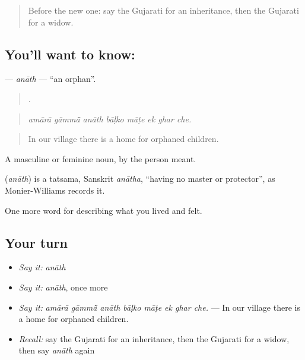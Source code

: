 \label{lesson:GU-C500-anath}



\begin{quote}
Before the new one: say the Gujarati for an inheritance, then the Gujarati for a widow.
\end{quote}

\subsection*{You'll want to know: }
\textbf{} — \emph{anāth} — \textquotedblleft{}an orphan\textquotedblright{}.

\begin{quote}
       .
\end{quote}

\begin{quote}
\emph{amārā gāmmā̃ anāth bāḷko māṭe ek ghar che.}
\end{quote}

\begin{quote}
In our village there is a home for orphaned children.
\end{quote}

A masculine or feminine noun, by the person meant.

\begin{cousinweb}
\textbf{} (\emph{anāth}) is a tatsama, Sanskrit \emph{anātha}, \textquotedblleft{}having no master or protector\textquotedblright{}, as Monier-Williams records it.
\end{cousinweb}

\begin{grammarlens}[title={What you've built}]
One more word for describing what you lived and felt.
\end{grammarlens}

\subsection*{Your turn}
\begin{itemize}
\raggedright
  \item \emph{Say it:} \emph{anāth}
  \item \emph{Say it:} \emph{anāth}, once more
  \item \emph{Say it:} \emph{amārā gāmmā̃ anāth bāḷko māṭe ek ghar che.} — In our village there is a home for orphaned children.
  \item \emph{Recall:} say the Gujarati for an inheritance, then the Gujarati for a widow, then say \emph{anāth} again
\end{itemize}

